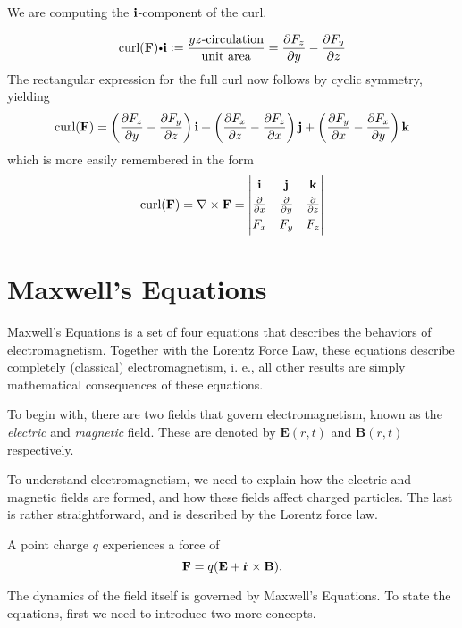 We are computing the $\mathbf{ i}$-component of the curl.

\begin{equation} \hbox{curl}(\vector{F})\bp\vector{i}  : = \dfrac{\hbox{$yz$-circulation}}{\hbox{unit area}}   = \Dh{F_z}{y} - \Dh{F_y}{z} \end{equation}
The rectangular expression for the full curl now follows by cyclic symmetry, yielding
\begin{equation} \hbox{curl}(\mathbf{ F}) = \left( \frac{\partial F_z}{\partial y} - \frac{\partial F_y}{\partial z} \right) \mathbf{ i}  + \left( \frac{\partial F_x}{\partial z} - \frac{\partial F_z}{\partial x} \right) \mathbf{ j}  + \left( \frac{\partial F_y}{\partial x} - \frac{\partial F_x}{\partial y} \right) \mathbf{ k} \end{equation}
which is more easily remembered in the form
\begin{equation} \hbox{curl}(\vector{F}) = \grad\times\vector{F} = \left| \begin{matrix}\vector{i}& \vector{j}& \vector{k}\cr  \noalign{\smallskip}  \Dh{}{x}& \Dh{}{y}& \Dh{}{z}\cr  \noalign{\smallskip}  F_x& F_y& F_z\cr\end{matrix}\right| \end{equation}

  


\section{Maxwell's Equations}
Maxwell's Equations is a set of four equations that describes the behaviors of electromagnetism. Together with the Lorentz Force Law, these equations  describe completely (classical) electromagnetism, i. e., all other results are simply mathematical consequences of these equations.

To begin with, there are two fields that govern electromagnetism, known as the \emph{electric} and \emph{magnetic} field. These are denoted by $\mathbf{E}(r, t)$ and $\mathbf{B}(r, t)$ respectively.

To understand electromagnetism, we need to explain  how the electric and magnetic fields are formed, and how these fields affect charged particles. The last  is rather straightforward, and is described by the Lorentz force law.

\begin{df}
  A point charge $q$ experiences a force of
  \[
    \mathbf{F} = q(\mathbf{E} + \dot{\mathbf{ r}} \times \mathbf{B}).
  \]
\end{df}

The dynamics of the field itself is governed by Maxwell's Equations. To state the equations, first  we need to introduce two more concepts.

